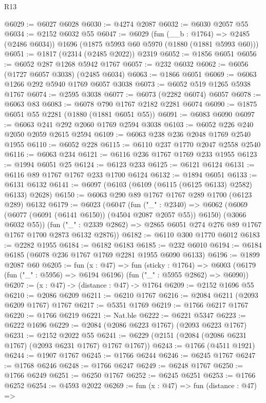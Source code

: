\begin{lexlean}{R13}
\begin{coremodule}
@6029 := @6027 @6028
@6030 := @4274 @2087
@6032 := @6030 @2057 @55
@6034 := @2152 @6032 @55
@6047 := @6029
    (fun (__b : @1764) => @2485 (@2486 @6034))
    @1696
    (@1875 @5993 @60 @5970 (@1880 (@1881 @5993 @60)))
@6051 := @1817 (@2314 (@2485 @2022)) @2319
@6052 := @1856 @6051
@6056 := @6052 @287 @1268 @5942 @1767
@6057 := @232 @6032
@6062 := @6056 (@1727 @6057 @3038) (@2485 @6034)
@6063 := @1866 @6051
@6069 := @6063 @1266 @292 @5940 @1769 @6057 @3038
@6073 := @6052 @519 @1265 @5938 @1767
@6074 := @2595 @3038
@6077 := @6073 (@2282 @6074) @6057
@6078 := @6063 @83
@6083 := @6078 @790 @1767 @2182 @2281 @6074
@6090 := @1875 @6051 @55 @2281 (@1880 (@1881 @6051 @55))
@6091 := @6083 @6090
@6097 := @6063 @241 @292 @2060 @1769 @2594 @3038
@6103 := @6052 @226 @240 @2050 @2059 @2615 @2594
@6109 := @6063 @238 @236 @2048 @1769 @2540 @1955
@6110 := @6052 @228
@6115 := @6110 @237 @1770 @2047 @2558 @2540
@6116 := @6063 @234
@6121 := @6116 @236 @1767 @1769 @233 @1955
@6123 := @1994 @6051 @25
@6124 := @6123 @233
@6125 := @6121 @6124
@6131 := @6116 @89 @1767 @1767 @233 @1700 @6124
@6132 := @1894 @6051
@6133 := @6131 @6132
@6141 := @6097 (@6103 (@6109 (@6115 (@6125 @6133) @2582) @6133) @2628)
@6150 := @6063 @290 @89 @1767 @1767 @289 @1700 (@6123 @289) @6132
@6179 := @6023
    (@6047
      (fun ("_" : @2340) =>
      @6062 (@6069 (@6077 (@6091 (@6141 @6150)) (@4504 @2087 @2057 @55)) @6150) (@3066 @6032 @55))
      (fun ("_" : @2339 @2862) => @2865 @6051 @274 @276 @89 @1767 @1767 @1700 @2873 @6132 @2876))
@6182 := @6110 @300 @1770 @6012
@6183 := @2282 @1955
@6184 := @6182 @6183
@6185 := @232 @6010
@6194 := @6184 @6185 (@6078 @236 @1767 @1769 @2281 @1955 @6090 @6133)
@6196 := @1899 @2087 @60
@6205 := fun (x : @47) =>
  fun (sticky : @1764) =>
  @6003 (@6179 (fun ("_" : @5956) => @6194 @6196) (fun ("_" : @5955 @2862) => @6090))
@6207 := (x : @47) -> (distance : @47) -> @1764
@6209 := @2152 @1696 @55
@6210 := @2086 @6209
@6211 := @6210 @1767
@6216 := @2084 @6211 (@2093 @6209 @1767) @1767
@6217 := @5351 @1769
@6219 := @1766 @6217 @1767
@6220 := @1766 @6219
@6221 := Nat.ble
@6222 := @6221 @5347
@6223 := @6222 @1696
@6229 := @2084 (@2086 @6223 @1767) (@2093 @6223 @1767)
@6231 := @2152 @2022 @55
@6241 := @6229 (@2151 (@2084 (@2086 @6231 @1767) (@2093 @6231 @1767) @1767 @1767))
@6243 := @1766 (@4511 @1921)
@6244 := @1907 @1767
@6245 := @1766 @6244
@6246 := @6245 @1767
@6247 := @1768 @6246
@6248 := @1766 @6247
@6249 := @6248 @1767
@6250 := @1766 @6249
@6251 := @6250 @1767
@6252 := @6245 @6251
@6253 := @1766 @6252
@6254 := @4593 @2022
@6269 := fun (x : @47) =>
  fun (distance : @47) =>

\end{coremodule}
\end{lexlean}
